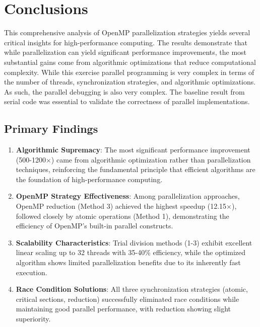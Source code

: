 \documentclass[11pt]{article}
\begin{document}
\section{Conclusions}

This comprehensive analysis of OpenMP parallelization strategies yields several critical insights for high-performance computing. The results demonstrate that while parallelization can yield significant performance improvements, the most substantial gains come from algorithmic optimizations that reduce computational complexity.
While this exercise parallel programming is very complex in terms of the number of threads, synchronization strategies, and algorithmic optimizations. As such, the parallel debugging is also very complex. The baseline result from serial code was essential to validate the correctness of parallel implementations.

\subsection{Primary Findings}

\begin{enumerate}
    \item \textbf{Algorithmic Supremacy}: The most significant performance improvement (500-1200$\times$) came from algorithmic optimization rather than parallelization techniques, reinforcing the fundamental principle that efficient algorithms are the foundation of high-performance computing.
    
    \item \textbf{OpenMP Strategy Effectiveness}: Among parallelization approaches, OpenMP reduction (Method 3) achieved the highest speedup (12.15$\times$), followed closely by atomic operations (Method 1), demonstrating the efficiency of OpenMP's built-in parallel constructs.
    
    \item \textbf{Scalability Characteristics}: Trial division methods (1-3) exhibit excellent linear scaling up to 32 threads with 35-40\% efficiency, while the optimized algorithm shows limited parallelization benefits due to its inherently fast execution.
    
    \item \textbf{Race Condition Solutions}: All three synchronization strategies (atomic, critical sections, reduction) successfully eliminated race conditions while maintaining good parallel performance, with reduction showing slight superiority.
\end{enumerate}
\end{document}
